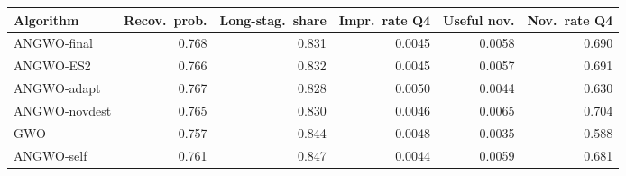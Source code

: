 \begin{tabular}{lrrrrr}
\toprule
Algorithm & Recov.\ prob. & Long-stag.\ share & Impr.\ rate Q4 & Useful nov. & Nov.\ rate Q4\\
\midrule
ANGWO-final & 0.768 & 0.831 & 0.0045 & 0.0058 & 0.690 \\
ANGWO-ES2 & 0.766 & 0.832 & 0.0045 & 0.0057 & 0.691 \\
ANGWO-adapt & 0.767 & 0.828 & 0.0050 & 0.0044 & 0.630 \\
ANGWO-novdest & 0.765 & 0.830 & 0.0046 & 0.0065 & 0.704 \\
GWO & 0.757 & 0.844 & 0.0048 & 0.0035 & 0.588 \\
ANGWO-self & 0.761 & 0.847 & 0.0044 & 0.0059 & 0.681 \\
\bottomrule
\end{tabular}